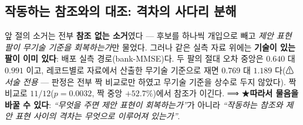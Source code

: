 \documentclass[11pt]{report}
\numberwithin{equation}{chapter}
\numberwithin{figure}{chapter}
\numberwithin{table}{chapter}
\begin{document}
\subsection{작동하는 참조와의 대조: 격차의 사다리 분해}
\label{sec:ladder}

앞 절의 소거는 전부 \textbf{참조 없는 소거}였다 --- 후보를 하나씩 개입으로 빼고
\emph{제안 표현 팔이 무기술 기준을 회복하는가}만 물었다. 그러나 같은 실측 자료 위에는
\textbf{기술이 있는 팔이 이미 있다}: 배포 실측 경로(bank-MMSE)다. 두 팔의 절대 오차
중앙은 $0.640$ 대 $0.991$ 이고, 레코드별로 자료에서 산출한 무기술 기준으로 재면
$0.769$ 대 $1.189$ 다(⚠\emph{서술 전용} --- 판정은 전부 짝 비교로만 하였고 무기술
기준을 상수로 두지 않았다). 짝 비교로 \textbf{$11/12$}($p = 0.0032$, 짝 중앙
$+52.7\%$)에서 참조가 이긴다.
⟹ ★\textbf{따라서 물음을 바꿀 수 있다}: \emph{``무엇을 주면 제안 표현이 회복하는가''}가
아니라 \emph{``작동하는 참조와 제안 표현 사이의 격차는 무엇으로 이루어져 있는가''}.
\end{document}
